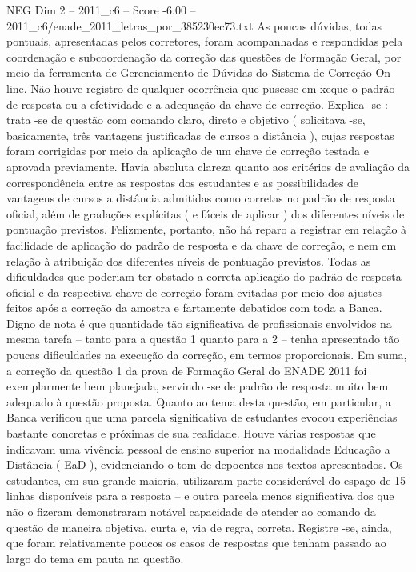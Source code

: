 \begin{textsample}{NEG Dim 2 – 2011\_c6 – Score -6.00 – 2011\_c6/enade\_2011\_letras\_por\_385230ec73.txt}
As poucas dúvidas, todas pontuais, apresentadas pelos corretores, foram acompanhadas e respondidas pela coordenação e subcoordenação da correção das questões de Formação Geral, por meio da ferramenta de Gerenciamento de Dúvidas do Sistema de Correção On-line.
Não houve registro de qualquer ocorrência que pusesse em xeque o padrão de resposta ou a efetividade e a adequação da chave de correção.
Explica -se : trata -se de questão com comando claro, direto e objetivo ( solicitava -se, basicamente, três vantagens justificadas de cursos a distância ), cujas respostas foram corrigidas por meio da aplicação de um chave de correção testada e aprovada previamente.
Havia absoluta clareza quanto aos critérios de avaliação da correspondência entre as respostas dos estudantes e as possibilidades de vantagens de cursos a distância admitidas como corretas no padrão de resposta oficial, além de gradações explícitas ( e fáceis de aplicar ) dos diferentes níveis de pontuação previstos.
Felizmente, portanto, não há reparo a registrar em relação à facilidade de aplicação do padrão de resposta e da chave de correção, e nem em relação à atribuição dos diferentes níveis de pontuação previstos.
Todas as dificuldades que poderiam ter obstado a correta aplicação do padrão de resposta oficial e da respectiva chave de correção foram evitadas por meio dos ajustes feitos após a correção da amostra e fartamente debatidos com toda a Banca.
Digno de nota é que quantidade tão significativa de profissionais envolvidos na mesma tarefa – tanto para a questão 1 quanto para a 2 – tenha apresentado tão poucas dificuldades na execução da correção, em termos proporcionais.
Em suma, a correção da questão 1 da prova de Formação Geral do ENADE 2011 foi exemplarmente bem planejada, servindo -se de padrão de resposta muito bem adequado à questão proposta.
Quanto ao tema desta questão, em particular, a Banca verificou que uma parcela significativa de estudantes evocou experiências bastante concretas e próximas de sua realidade.
Houve várias respostas que indicavam uma vivência pessoal de ensino superior na modalidade Educação a Distância ( EaD ), evidenciando o tom de depoentes nos textos apresentados.
Os estudantes, em sua grande maioria, utilizaram parte considerável do espaço de 15 linhas disponíveis para a resposta – e outra parcela menos significativa dos que não o fizeram demonstraram notável capacidade de atender ao comando da questão de maneira objetiva, curta e, via de regra, correta.
Registre -se, ainda, que foram relativamente poucos os casos de respostas que tenham passado ao largo do tema em pauta na questão.

\end{textsample}
